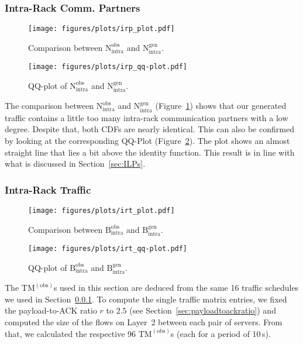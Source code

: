 \documentclass[journal,10pt]{IEEEtran}
\newcommand{\obstm}{\ensuremath{\mathrm{TM}^{(\mathrm{obs})}}}
\newcommand{\bytes}[2]{\ensuremath{\mathrm{B}^{\mathrm{#1}}_{\mathrm{#2}}}}
\newcommand{\partners}[2]{\ensuremath{\mathrm{N}^{\mathrm{#1}}_{\mathrm{#2}}}}
\begin{document}
				
		
		
		\subsubsection{Intra-Rack Comm. Partners}
		\label{sec:Intra-RackCommPartners}
		\begin{figure}
			\centering
				\texttt{[image: figures/plots/irp\_plot.pdf]}
				\caption{Comparison between \partners{obs}{intra} and \partners{gen}{intra}.}
				\label{fig:irp_plot}
\end{figure}
		
		\begin{figure}
			\centering
				\texttt{[image: figures/plots/irp\_qq-plot.pdf]}
					\caption{QQ-plot of \partners{obs}{intra} and \partners{gen}{intra}.}
				\label{fig:irp_qq-plot}
\end{figure}
		The comparison between \partners{obs}{intra} and \partners{gen}{intra}
		(Figure~\ref{fig:irp_plot})
		shows that our generated traffic contains a little too many intra-rack communication partners with a low degree.
		Despite that, both CDFs are nearly identical. This can also be confirmed by looking at the corresponding QQ-Plot (Figure~\ref{fig:irp_qq-plot}).
		The plot shows an almost straight line that lies a bit above the identity function.
		This result is in line with what is discussed in Section~\ref{sec:ILPs}.


		\subsubsection{Intra-Rack Traffic}
		\begin{figure}
			\centering
				\texttt{[image: figures/plots/irt\_plot.pdf]}
				\caption{Comparison between \bytes{obs}{intra} and \bytes{gen}{intra}.}
				\label{fig:irt_plot}
\end{figure}
		
		\begin{figure}
			\centering
				\texttt{[image: figures/plots/irt\_qq-plot.pdf]}
				\caption{QQ-plot of \bytes{obs}{intra} and \bytes{gen}{intra}.}
				\label{fig:irt_qq-plot}
\end{figure}
		The \obstm{}s used in this section are deduced from the same 16 traffic schedules we used
		in Section~\ref{sec:Intra-RackCommPartners}. To compute the single traffic matrix entries, we
		fixed the payload-to-ACK ratio $r$ to $2.5$ (see Section~\ref{sec:payloadtoackratio})
		and computed the size of the flows on Layer~2 between each pair of servers. 
		From that, we calculated the respective 96 \obstm{}s (each for a period of 10\,s).
		
\end{document}
